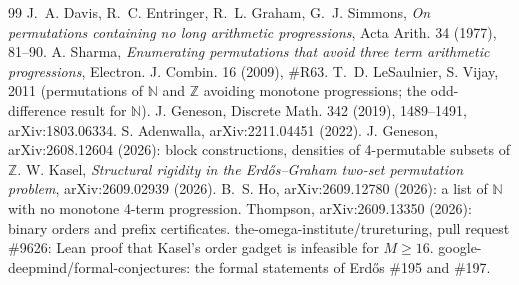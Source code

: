 \documentclass[11pt,letterpaper]{article}
\newcommand{\Z}{\mathbb{Z}}
\newcommand{\N}{\mathbb{N}}
\begin{document}
\begin{thebibliography}{99}\small
{} J.~A. Davis, R.~C. Entringer, R.~L. Graham, G.~J. Simmons, \emph{On permutations containing
no long arithmetic progressions}, Acta Arith. 34 (1977), 81--90.
 A. Sharma, \emph{Enumerating permutations that avoid three term arithmetic progressions},
Electron. J. Combin. 16 (2009), \#R63.
 T.~D. LeSaulnier, S. Vijay, 2011 (permutations of $\N$ and $\Z$ avoiding monotone progressions;
the odd-difference result for $\N$).
 J. Geneson, Discrete Math. 342 (2019), 1489--1491, arXiv:1803.06334.
 S. Adenwalla, arXiv:2211.04451 (2022).
 J. Geneson, arXiv:2608.12604 (2026): block constructions, densities of 4-permutable subsets
of $\Z$.
 W. Kasel, \emph{Structural rigidity in the Erd\H{o}s--Graham two-set permutation problem},
arXiv:2609.02939 (2026).
 B.~S. Ho, arXiv:2609.12780 (2026): a list of $\N$ with no monotone 4-term progression.
 Thompson, arXiv:2609.13350 (2026): binary orders and prefix certificates.
 the-omega-institute/trureturing, pull request \#9626: Lean proof that Kasel's order gadget is
infeasible for $M \ge 16$.
 google-deepmind/formal-conjectures: the formal statements of Erd\H{o}s \#195 and \#197.
\end{thebibliography}
\end{document}
